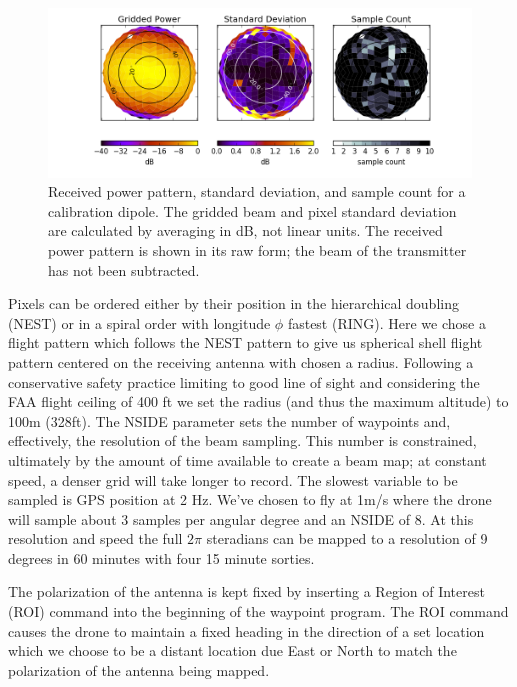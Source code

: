 \documentclass[preprint2,numberedappendix,tighten,twocolappendix]{aastex6}
\begin{document}
\begin{figure}[ht]
\begin{center}
\includegraphics[width=\textwidth]{figures/GB_power_rms_count.png}
\caption{Received power pattern, standard deviation, and sample count for a calibration dipole. The gridded beam and pixel standard deviation are calculated by averaging in dB, not linear units. The received power pattern is shown in its raw form; the beam of the transmitter has not been subtracted.}
\label{fig:beam_std_count}
\end{center}
\end{figure}
Pixels can be ordered either by their position in the hierarchical doubling (NEST) or in a spiral order with  longitude $\phi$ fastest (RING).  Here we chose a flight pattern which follows the NEST pattern to give us spherical shell flight pattern centered on the receiving antenna with chosen a radius. Following a conservative safety practice limiting to good line of sight and considering the FAA flight ceiling of 400 ft we set the radius (and thus the maximum altitude) to 100m (328ft). The NSIDE parameter sets the number of waypoints and, effectively, the resolution of the beam sampling.  This number is constrained, ultimately by the amount of time available to create a beam map; at constant speed, a denser grid will take longer to record.  The slowest variable to be sampled is GPS position at 2 Hz. We've chosen to fly at 1m/s where the drone will sample about 3 samples per angular degree and an NSIDE of 8.  At this resolution and speed the full $2\pi$ steradians can be mapped to a resolution of 9 degrees in 60 minutes with four 15 minute sorties.

The polarization of the antenna is kept fixed by inserting a Region of Interest (ROI) command into the beginning of the waypoint program.  The ROI command causes the drone to maintain a fixed heading in the direction of a set location which we choose to be a distant location due East or North to match the polarization of the antenna being mapped.
\end{document}
